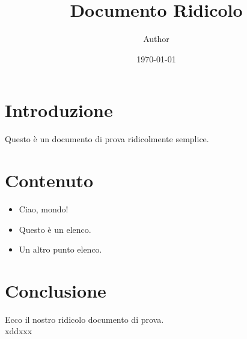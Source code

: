 \documentclass{article}
\title{Documento Ridicolo}
\author{Author}
\date{\today}
\begin{document}
\maketitle

\section{Introduzione}
Questo è un documento di prova ridicolmente semplice.

\section{Contenuto}
\begin{itemize}
    \item Ciao, mondo!
    \item Questo è un elenco.
    \item Un altro punto elenco.
\end{itemize}

\section{Conclusione}
Ecco il nostro ridicolo documento di prova.
\\xddxxx
\end{document}
